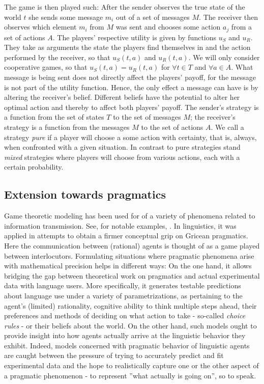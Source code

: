 \documentclass[10]{article}
\begin{document}
The game is then played such: After the sender observes the true state of the world $t$ she sends some message $m_i$ out of a set of messages $M$.
The receiver then observes which element $m_i$ from $M$ was sent and chooses some action $a_j$ from a set of actions $A$.
The players' respective utility is given by functions $u_S$ and $u_R$. They take as arguments the state the players find themselves in and the action performed by the receiver, so that $u_S(t,a)$ and $u_R(t,a)$. We will only consider cooperative games, so that $u_S(t,a)=u_R(t,a)$ for $\forall t\in T$ and $\forall a\in A$.
What message is being sent does not directly affect the players' payoff, for the message is not part of the utility function. Hence, the only effect a message can have is by altering the receiver's belief. Different beliefs have the potential to alter her optimal action and thereby to affect both players' payoff.
The sender's strategy is a function from the set of states $T$ to the set of messages $M$; the receiver's strategy is a function from the messages $M$ to the set of actions $A$.
We call a strategy \textit{pure} if a player will choose a some action with certainty, that is, always, when confronted with a given situation. In contrast to pure strategies stand
\textit{mixed} strategies where players will choose from various actions, each with a certain probability.

\subsection{Extension towards pragmatics}
Game theoretic modeling has been used for of a variety of phenomena related to information transmission. See, for notable examples, \cite{spence1973job, smith1982evolution, cho1987signaling}.
In linguistics, it was applied in attempts to obtain a firmer conceptual grip on Gricean pragmatics. Here the communication between (rational) agents is thought of as a game played between interlocutors. Formulating situations where pragmatic phenomena arise with mathematical precision helps in different ways: On the one hand, it allows bridging the gap between theoretical work on pragmatics and actual experimental data with language users. More specifically, it generates testable predictions about language use under a variety of parametrizations, as pertaining to the agent's (limited) rationality, cognitive ability to think multiple steps ahead, their preferences and methods of deciding on what action to take - so-called \textit{choice rules} %
 - or their beliefs about the world. On the other hand, such models ought to provide insight into how agents actually arrive at the linguistic behavior they exhibit. %
 Indeed, models concerned with pragmatic behavior of linguistic agents are caught between the pressure of trying to accurately predict and fit experimental data and the hope to realistically capture one or the other aspect of a pragmatic phenomenon - to represent ''what actually is going on'', so to speak.
\end{document}
